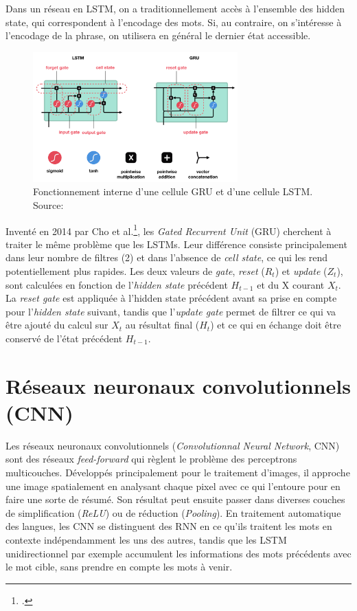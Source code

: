 Dans un réseau en LSTM, on a traditionnellement accès à l'ensemble des hidden state, qui correspondent à l'encodage des mots. Si, au contraire, on s'intéresse à l'encodage de la phrase, on utilisera en général le dernier état accessible.

\begin{figure}[h]
    \centering
    \includegraphics[height=5cm]{results/deep-learning/explanations/GRU LSTM.png}
    \caption{Fonctionnement interne d'une cellule GRU et d'une cellule LSTM. Source: \cite{nguyen_illustrated_2019}}
    \label{fig:deep-learning:lstm-gru}
\end{figure}


\label{deep-learning:gru}
Inventé en 2014 par Cho et al.\footcite{cho_properties_2014}, les \textit{Gated Recurrent Unit} (GRU) cherchent à traiter le même problème que les LSTMs. Leur différence consiste principalement dans leur nombre de filtres (2) et dans l'absence de \textit{cell state}, ce qui les rend potentiellement plus rapides. Les deux valeurs de \textit{gate}, \textit{reset} ($R_{t}$) et \textit{update} ($Z_{t}$), sont calculées en fonction de l'\textit{hidden state} précédent $H_{t-1}$ et du X courant $X_{t}$. La \textit{reset gate} est appliquée à l'hidden state précédent avant sa prise en compte pour l'\textit{hidden state} suivant, tandis que l'\textit{update gate} permet de filtrer ce qui va être ajouté du calcul sur $X_{t}$ au résultat final ($H_{t}$) et ce qui en échange doit être conservé de l'état précédent $H_{t-1}$.


\section{Réseaux neuronaux convolutionnels (CNN)}
\label{deep-learning:CNN}

Les réseaux neuronaux convolutionnels (\textit{Convolutionnal Neural Network}, CNN) sont des réseaux \textit{feed-forward} qui règlent le problème des perceptrons multicouches. Développés principalement pour le traitement d'images, il approche une image spatialement en analysant chaque pixel avec ce qui l'entoure pour en faire une sorte de résumé. Son résultat peut ensuite passer dans diverses couches de simplification (\textit{ReLU}) ou de réduction (\textit{Pooling}). En traitement automatique des langues, les CNN se distinguent des RNN en ce qu'ils traitent les mots en contexte indépendamment les uns des autres, tandis que les LSTM unidirectionnel par exemple accumulent les informations des mots précédents avec le mot cible, sans prendre en compte les mots à venir.

